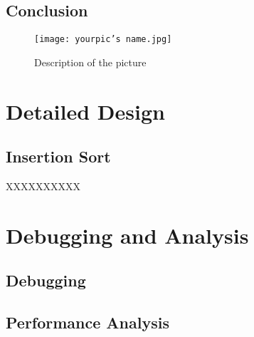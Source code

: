 \documentclass[12pt,a4paper]{article}
\begin{document}
\subsection{Conclusion}

{
\begin{figure*}[t]
\centering
\texttt{[image: yourpic's name.jpg]} 
\captionsetup{font=small}
\caption{Description of the picture}
\label{fig1}
\end{figure*}
}

%
%
\section{Detailed Design}

\subsection{Insertion Sort}

\begin{algorithm}
\caption{XXXXXXXXXX}
\end{algorithm}

%
%
\section{Debugging and Analysis}

\subsection{Debugging}

\subsection{Performance Analysis}

\begin{table}[!ht]
    \centering
    \captionsetup{font=small}
    \caption{This table shows the best, worst, average time complexity and additional space complexity of ten sorting algorithms.}
\label{table1}
\end{table}
\end{document}
